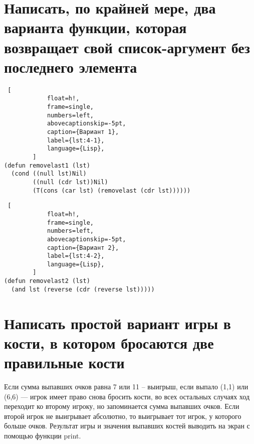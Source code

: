     \section{Написать, по крайней мере, два варианта функции, которая возвращает свой список-аргумент без последнего элемента}
    
        \begin{lstlisting} [
            float=h!,
            frame=single,
            numbers=left,
            abovecaptionskip=-5pt,
            caption={Вариант 1},
            label={lst:4-1},
            language={Lisp},
        ]
(defun removelast1 (lst)
  (cond ((null lst)Nil)
        ((null (cdr lst))Nil)
        (T(cons (car lst) (removelast (cdr lst))))))
        \end{lstlisting}
        
        \begin{lstlisting} [
            float=h!,
            frame=single,
            numbers=left,
            abovecaptionskip=-5pt,
            caption={Вариант 2},
            label={lst:4-2},
            language={Lisp},
        ]
(defun removelast2 (lst)
  (and lst (reverse (cdr (reverse lst)))))
        \end{lstlisting}
    
    \section{Написать простой вариант игры в кости, в котором бросаются две правильные кости}
    
    Если сумма выпавших очков равна 7 или 11 -- выигрыш, если выпало (1,1) или (6,6) --- игрок имеет право снова бросить кости, во всех остальных случаях ход переходит ко второму игроку, но запоминается сумма выпавших очков. Если второй игрок не выигрывает абсолютно, то выигрывает тот игрок, у которого больше очков. Результат игры и значения выпавших костей выводить на экран с помощью функции print.
    
